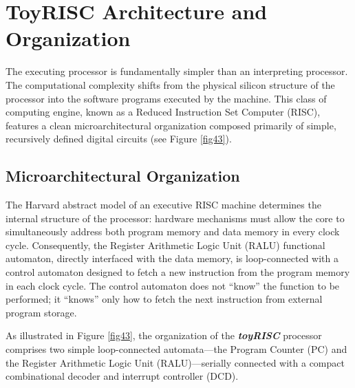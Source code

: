 \section{ToyRISC Architecture and Organization}\label{sec:toyrisc_arch}

The executing processor is fundamentally simpler than an interpreting processor.
The computational complexity shifts from the physical silicon structure of the processor into the software programs executed by the machine. This class of computing engine, known as a Reduced Instruction Set Computer (RISC), features a clean microarchitectural organization composed primarily of simple, recursively defined digital circuits (see Figure \ref{fig43}).


\subsection{Microarchitectural Organization}\label{sec:toyrisc_org}

The Harvard abstract model of an executive RISC machine determines the internal structure of the processor: hardware mechanisms must allow the core to simultaneously address both program memory and data memory in every clock cycle. Consequently, the Register Arithmetic Logic Unit (RALU) functional automaton, directly interfaced with the data memory, is loop-connected with a control automaton designed to fetch a new instruction from the program memory in each clock cycle. The control automaton does not ``know'' the function to be performed; it ``knows'' only how to fetch the next instruction from external program storage.

As illustrated in Figure \ref{fig43}, the organization of the \textbf{\textit{toyRISC}} processor comprises two simple loop-connected automata—the Program Counter (PC) and the Register Arithmetic Logic Unit (RALU)—serially connected with a compact combinational decoder and interrupt controller (DCD).

